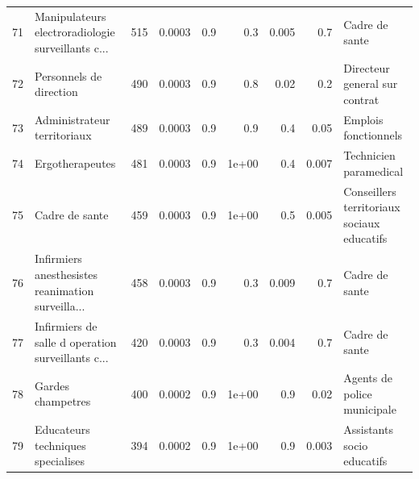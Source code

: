 \documentclass[11pt,a4paper]{article}
\begin{document}
\begin{tabular}{llrrrrrrl}
	71  &  Manipulateurs electroradiologie surveillants c... &            515 &         0.0003 &                    0.9 &                0.3 &                             0.005 &                                      0.7 &                                     Cadre de sante \\
	72  &                            Personnels de direction &            490 &         0.0003 &                    0.9 &                0.8 &                              0.02 &                                      0.2 &                      Directeur general sur contrat \\
	73  &                        Administrateur territoriaux &            489 &         0.0003 &                    0.9 &                0.9 &                               0.4 &                                     0.05 &                               Emplois fonctionnels \\
	74  &                                    Ergotherapeutes &            481 &         0.0003 &                    0.9 &              1e+00 &                               0.4 &                                    0.007 &                             Technicien paramedical \\
	75  &                                     Cadre de sante &            459 &         0.0003 &                    0.9 &              1e+00 &                               0.5 &                                    0.005 &         Conseillers territoriaux sociaux educatifs \\
	76  &  Infirmiers anesthesistes reanimation surveilla... &            458 &         0.0003 &                    0.9 &                0.3 &                             0.009 &                                      0.7 &                                     Cadre de sante \\
	77  &  Infirmiers de salle d operation surveillants c... &            420 &         0.0003 &                    0.9 &                0.3 &                             0.004 &                                      0.7 &                                     Cadre de sante \\
	78  &                                  Gardes champetres &            400 &         0.0002 &                    0.9 &              1e+00 &                               0.9 &                                     0.02 &                        Agents de police municipale \\
	79  &                  Educateurs techniques specialises &            394 &         0.0002 &                    0.9 &              1e+00 &                               0.9 &                                    0.003 &                         Assistants socio educatifs \\

\end{tabular}
\end{document}
